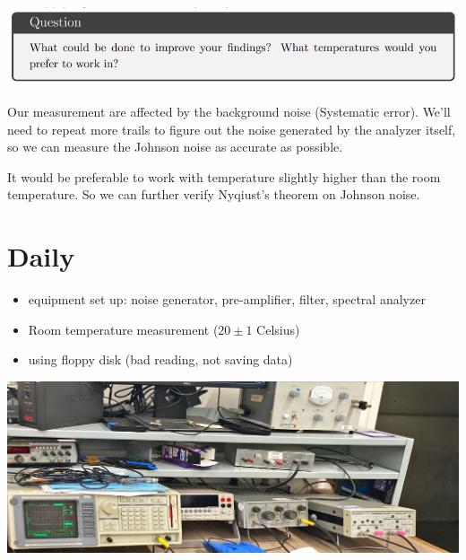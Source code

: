 \documentclass[a4paper]{tufte-handout}
\begin{document}
\hrulefill

\includegraphics[width = 1\textwidth]{figures/q7.png}

Our measurement are affected by the background noise (Systematic error). We'll need to repeat more trails to figure out the noise generated by the analyzer itself, so we can measure the Johnson noise as accurate as possible.

It would be preferable to work with temperature slightly higher than the room temperature. So we can further verify Nyqiust's theorem on Johnson noise. 

\hrulefill

\newpage

\section{Daily}
\begin{itemize}
    \item {equipment set up: } {noise generator, pre-amplifier, filter, spectral analyzer}
    \item Room temperature measurement  ($20\pm 1$ Celsius)
    \item using floppy disk (bad reading, not saving data)
    
\end{itemize}
\includegraphics[width = 1 \textwidth]{figures/day1_setup.jpg}
\\
\end{document}
